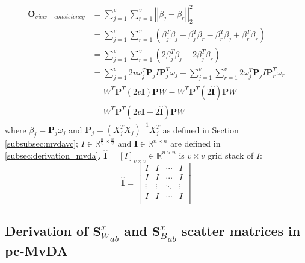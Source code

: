 \begin{appendix}
    \begin{equation}
        \begin{split}
            \boldsymbol{O}_{view-consistency} &= \sum_{j=1}^{v}\sum_{r=1}^{v}\left|\left|\beta_j - \beta_r\right|\right|_2^2 \\
            &= \sum_{j=1}^{v}\sum_{r=1}^{v}\left(\beta_j^T\beta_j - \beta_j^T\beta_r - \beta_r^T\beta_j + \beta_r^T\beta_r\right) \\
            &= \sum_{j=1}^{v}\sum_{r=1}^{v}\left(2\beta_j^T\beta_j - 2\beta_j^T\beta_r\right) \\
            &= \sum_{j=1}^{v}2v\omega_j^T\boldsymbol{P}_j I \boldsymbol{P}_j^T\omega_j - \sum_{j=1}^{v}\sum_{r=1}^{v}2\omega_j^T\boldsymbol{P}_j I \boldsymbol{P}_r^T\omega_r \\
            &= W^T \boldsymbol{P}^T \left(2v\boldsymbol{I}\right) \boldsymbol{P} W - W^T \boldsymbol{P}^T \left(2\boldsymbol{\widehat{I}}\right) \boldsymbol{P} W \\
            &= W^T \boldsymbol{P}^T \left(2v\boldsymbol{I} - 2\boldsymbol{\widehat{I}}\right) \boldsymbol{P} W
        \end{split}
        \label{eq:mvdavc_vc_derivation}
    \end{equation}
    where $\beta_j = \boldsymbol{P}_j\omega_j$ and $\boldsymbol{P}_j = \left(X_j^T X_j\right)^{-1}X_j^T$ as defined in Section \ref{subsubsec:mvdavc}; $I \in \mathbb{R}^{\frac{n}{v}\times \frac{n}{v}}$ and $\boldsymbol{I} \in \mathbb{R}^{n\times n}$ are defined in \ref{subsec:derivation_mvda}, $\boldsymbol{\widehat{I}} = \left[I\right]_{v\times v} \in \mathbb{R}^{n\times n}$ is $v\times v$ grid stack of $I$:
    \begin{equation}
        \boldsymbol{\widehat{I}} = \left[\begin{matrix}I&I&\cdots&I\\I&I&\cdots&I\\\vdots&\vdots&\ddots&\vdots\\I&I&\cdots&I\\\end{matrix}\right]
    \end{equation}

\subsection{Derivation of \texorpdfstring{${\boldsymbol{S}^x_W}_{ab}$}{paired intra-class} and \texorpdfstring{${\boldsymbol{S}^x_B}_{ab}$}{paired inter-class} scatter matrices in pc-MvDA} \label{subsec:derivation_pcmvda}


\end{appendix}
